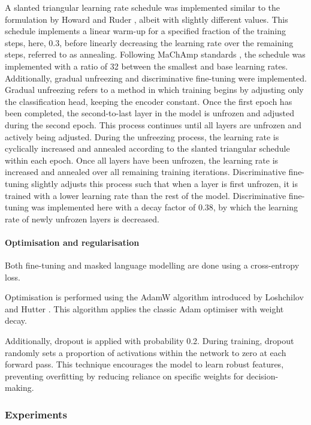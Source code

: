 \documentclass[12pt]{report}
\begin{document}
A slanted triangular learning rate schedule was implemented similar to the formulation by Howard and Ruder \citeyear{Howard2018}, albeit with slightly different values.
This schedule implements a linear warm-up for a specified fraction of the training steps, here, 0.3, before linearly decreasing the learning rate over the remaining steps, referred to as annealing.
Following MaChAmp standards \cite{MaChAmp}, the schedule was implemented with a ratio of 32 between the smallest and base learning rates.
Additionally, gradual unfreezing and discriminative fine-tuning were implemented.
Gradual unfreezing refers to a method in which training begins by adjusting only the classification head, keeping the encoder constant.
Once the first epoch has been completed, the second-to-last layer in the model is unfrozen and adjusted during the second epoch.
This process continues until all layers are unfrozen and actively being adjusted.
During the unfreezing process, the learning rate is cyclically increased and annealed according to the slanted triangular schedule within each epoch.
Once all layers have been unfrozen, the learning rate is increased and annealed over all remaining training iterations.
Discriminative fine-tuning slightly adjusts this process such that when a layer is first unfrozen, it is trained with a lower learning rate than the rest of the model.
Discriminative fine-tuning was implemented here with a decay factor of 0.38, by which the learning rate of newly unfrozen layers is decreased.

\paragraph*{Optimisation and regularisation}
Both fine-tuning and masked language modelling are done using a cross-entropy loss.

Optimisation is performed using the AdamW algorithm introduced by Loshchilov and Hutter \citeyear{AdamW}.
This algorithm applies the classic Adam optimiser \cite{Adam} with weight decay.

Additionally, dropout is applied with probability 0.2.
During training, dropout randomly sets a proportion of activations within the network to zero at each forward pass.
This technique encourages the model to learn robust features, preventing overfitting by reducing reliance on specific weights for decision-making.

\subsubsection*{Experiments}
\end{document}
